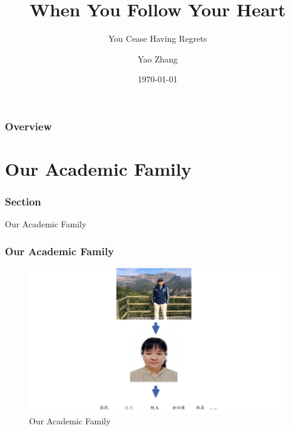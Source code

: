 \documentclass[aspectratio=2516]{beamer}
\title[Follow Your Heart]{ When You Follow Your Heart} %
\subtitle{ You Cease Having Regrets}
\author{Yao Zhang} %
\institute[UCAS \& NAOC] 
{	
%    
    
    University of Chinese Academy of Sciences \\
     
	\vspace{0.2cm}
	
	 National Astronomical Observatories, Chinese Academy of Sciences \\
	 
	 
	 
	 \vspace{0.5cm}
	
     {\color{blue} \url{https://zhims.github.io}}
}
\date{\today}
\begin{document}
	\begin{frame}
	\titlepage 
	\end{frame}
\begin{frame}
\frametitle{Overview} 
\begin{small}
	\tableofcontents
\end{small} 
\end{frame}

\section{Our Academic Family}

\begin{frame}
\frametitle{ Section \uppercase\expandafter{}}


\begin{center}
	\Large Our Academic Family
\end{center}

\end{frame}

\begin{frame}
\frametitle{Our Academic Family}


\begin{figure}
	\centering
	\includegraphics[width=0.9\linewidth,height=0.5\linewidth]{yao_zhang.png}
	\caption{Our Academic Family}
	\label{fig1} 
\end{figure}

\end{frame}



\end{document}

